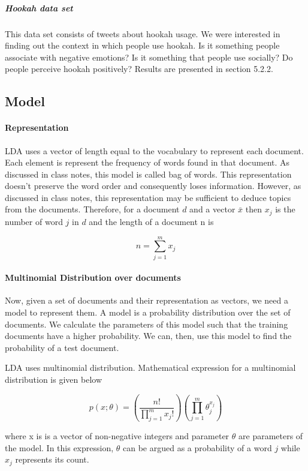 \documentclass[11pt,a4paper,oneside]{article}
\begin{document}
\subparagraph{Hookah data set}
This data set consists of tweets about hookah usage. We were interested in finding out the context in which people use hookah. Is it something people associate with negative emotions? Is it something that people use socially? Do people perceive hookah positively? Results are presented in section 5.2.2.

\subsection{Model}
\paragraph{Representation}
LDA uses a vector of length equal to the vocabulary to represent each document. Each element is represent the frequency of words found in that document. As discussed in class notes, this model is called bag of words. This representation doesn't preserve the word order and consequently loses information. However, as discussed in class notes, this representation may be sufficient to deduce topics from the documents. Therefore, for a document $d$ and a vector $\bar{x}$ then $x_j$ is the number of word $j$ in $d$ and the length of a document n is

\begin{equation}
	n = \sum^{m}_{j=1}x_j
\end{equation}

\paragraph{Multinomial Distribution over documents}
Now, given a set of documents and their representation as vectors, we need a model to represent them. A model is a probability distribution over the set of documents. We calculate the parameters of this model such that the training documents have a higher probability. We can, then, use this model to find the probability of a test document.

LDA uses multinomial distribution. Mathematical expression for a multinomial distribution is given below

\begin{equation}\label{multinomial}
p(x;\theta) = (\frac{n!}{\prod^m_{j=1}x_j!})(\prod^m_{j=1}\theta^{x_j}_j)
\end{equation}

where x is is a vector of non-negative integers and parameter $\theta$ are parameters of the model. In this expression, $\theta$ can be argued as a probability of a word $j$ while $x_j$ represents its count.
\end{document}
